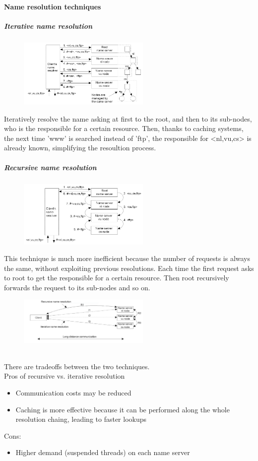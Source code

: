 \documentclass[10pt,a4paper]{article}
\begin{document}
\paragraph{Name resolution techniques}
\subparagraph{Iterative name resolution}
\begin{figure}[h!]
 \hfill \includegraphics[width=180pt]{images/iterative-dns.png}\hspace*{\fill}
  \label{fig:iterative}
\end{figure}
Iteratively resolve the name asking at first to the root, and then to its sub-nodes, who is the responsible for a certain resource. Then, thanks to caching systems, the next time 'www' is searched instead of 'ftp', the responsible for <nl,vu,cs> is already known, simplifying the resoultion process.
\subparagraph{Recursive name resolution}
\begin{figure}[h!]
 \hfill \includegraphics[width=180pt]{images/recursive-dns.png}\hspace*{\fill}
  \label{fig:recursive}
\end{figure}
This technique is much more inefficient because the number of requests is always the same, without exploiting previous resolutions. Each time the first request asks to root to get the responsible for a certain resource. Then root recursively forwards the request to its sub-nodes and so on. \pagebreak
\begin{figure}[h!]
 \hfill \includegraphics[width=180pt]{images/tradeoff-res.png}\hspace*{\fill}
  \label{fig:tradeoff-res}
\end{figure} \\
There are tradeoffs between the two techniques. \\ Pros of recursive vs. iterative resolution
\begin{itemize}
	\item Communication costs may be reduced
	\item Caching is more effective because it can be performed along the whole resolution chaing, leading to faster lookups
\end{itemize}
Cons:
\begin{itemize}
	\item Higher demand (suspended threads) on each name server
\end{itemize}
\end{document}
